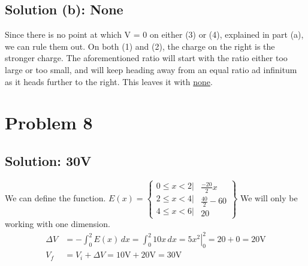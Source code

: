\documentclass[12pt]{article}
\begin{document}
\subsection{Solution (b): None}
Since there is no point at which V = 0 on either (3) or (4), explained in part (a), we can rule them out. 
On both (1) and (2), the charge on the right is the stronger charge.
The aforementioned ratio will start with the ratio either too large or too small, and will keep heading away from an equal ratio ad infinitum as it heads further to the right. 
This leaves it with \underline{none}.

\section{Problem 8}
\subsection{Solution: 30V}
We can define the function. 
\(E(x) = \left\{ \begin{matrix}
    0 \le x < 2| \\
    2 \le x < 4| \\
    4 \le x < 6| 
\end{matrix}
\begin{matrix}
    \frac{-20}{2}x\\
    \frac{40}{2} - 60\\
    20
\end{matrix} \right\}\)
We will only be working with one dimension.
\begin{align*}
    \Delta V &= -\int_{0}^{2} E(x)\,dx
        =   \int_0^2 10x\,dx
        =   \left. 5x^2 \right|_0^2
        =   20 + 0
        =   20 \unit{\volt}\\
    V_f &=  V_i + \Delta V
        =   10 \unit{\volt} + 20 \unit{\volt}
        =   \boxed{30 \unit{\volt}}
\end{align*}
\end{document}
